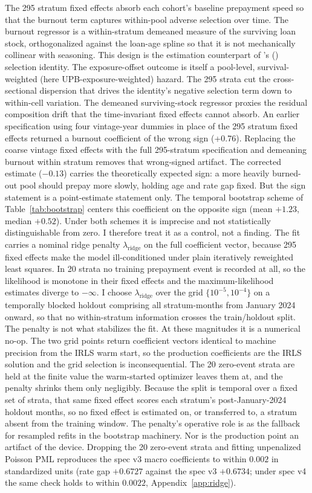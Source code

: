 \documentclass[12pt]{article}
\newcommand{\citepos}[1]{\citeauthor{#1}'s (\citeyear{#1})}
\begin{document}
The 295 stratum fixed effects absorb each cohort's baseline prepayment speed so that the burnout term captures within-pool adverse selection over time. The burnout regressor is a within-stratum demeaned measure of the surviving loan stock, orthogonalized against the loan-age spline so that it is not mechanically collinear with seasoning. This design is the estimation counterpart of \citepos{lesniewski2026} selection identity. The exposure-offset outcome is itself a pool-level, survival-weighted (here UPB-exposure-weighted) hazard. The 295 strata cut the cross-sectional dispersion that drives the identity's negative selection term down to within-cell variation. The demeaned surviving-stock regressor proxies the residual composition drift that the time-invariant fixed effects cannot absorb. An earlier specification using four vintage-year dummies in place of the 295 stratum fixed effects returned a burnout coefficient of the wrong sign (+0.76). Replacing the coarse vintage fixed effects with the full 295-stratum specification and demeaning burnout within stratum removes that wrong-signed artifact. The corrected estimate ($-0.13$) carries the theoretically expected sign: a more heavily burned-out pool should prepay more slowly, holding age and rate gap fixed. But the sign statement is a point-estimate statement only. The temporal bootstrap scheme of Table~\ref{tab:bootstrap} centers this coefficient on the opposite sign (mean $+1.23$, median $+0.52$). Under both schemes it is imprecise and not statistically distinguishable from zero. I therefore treat it as a control, not a finding. The fit carries a nominal ridge penalty $\lambda_{\mathrm{ridge}}$ on the full coefficient vector, because 295 fixed effects make the model ill-conditioned under plain iteratively reweighted least squares. In 20 strata no training prepayment event is recorded at all, so the likelihood is monotone in their fixed effects and the maximum-likelihood estimates diverge to $-\infty$. I choose $\lambda_{\mathrm{ridge}}$ over the grid $\{10^{-5}, 10^{-4}\}$ on a temporally blocked holdout comprising all stratum-months from January 2024 onward, so that no within-stratum information crosses the train/holdout split. The penalty is not what stabilizes the fit. At these magnitudes it is a numerical no-op. The two grid points return coefficient vectors identical to machine precision from the IRLS warm start, so the production coefficients are the IRLS solution and the grid selection is inconsequential. The 20 zero-event strata are held at the finite value the warm-started optimizer leaves them at, and the penalty shrinks them only negligibly. Because the split is temporal over a fixed set of strata, that same fixed effect scores each stratum's post-January-2024 holdout months, so no fixed effect is estimated on, or transferred to, a stratum absent from the training window. The penalty's operative role is as the fallback for resampled refits in the bootstrap machinery. Nor is the production point an artifact of the device. Dropping the 20 zero-event strata and fitting unpenalized Poisson PML reproduces the spec v3 macro coefficients to within $0.002$ in standardized units (rate gap $+0.6727$ against the spec v3 $+0.6734$; under spec v4 the same check holds to within $0.0022$, Appendix~\ref{app:ridge}). 
\end{document}
